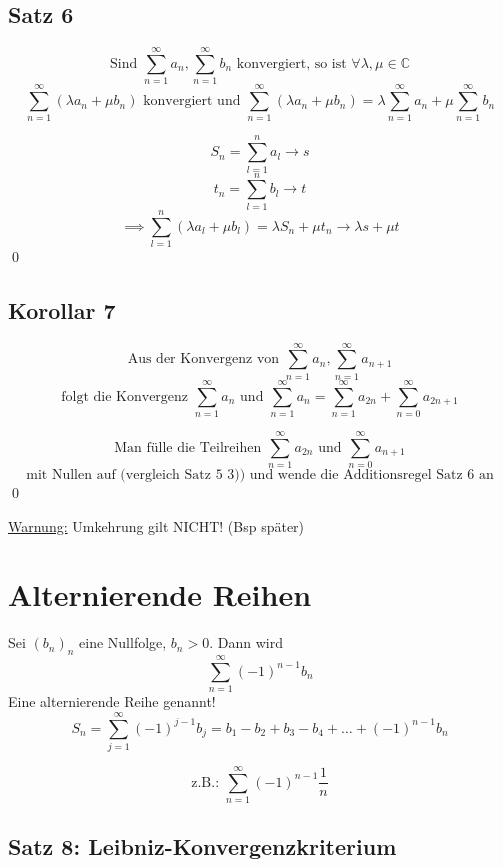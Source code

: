 \documentclass[fleqn]{scrbook}
\renewenvironment{proof}{{\bfseries Beweis }}{\qed}
\begin{document}
\subsection{Satz 6}

\[\text{Sind } \sum_{n=1}^\infty a_n, \sum_{n=1}^\infty b_n \text{  konvergiert, so ist } \forall \lambda, \mu \in \mathbb{C}\]
\[\sum_{n=1}^\infty (\lambda a_n + \mu b_n) \text{ konvergiert  und } \sum_{n=1}^\infty (\lambda a_n + \mu b_n) = \lambda \sum_{n=1}^\infty a_n + \mu \sum_{n=1}^\infty b_n \]

\begin{proof}
  \[S_n = \sum_{l=1}^n a_l \to s\]
  \[t_n = \sum_{l=1}^n b_l \to t\]
  \[\implies \sum_{l=1}^n (\lambda a_l + \mu b_l) = \lambda S_n + \mu t_n \to \lambda s + \mu t\]
\end{proof}

\subsection{Korollar 7}

\[\text{Aus der Konvergenz von } \sum_{n=1}^\infty a_n, \sum_{n=1}^\infty a_{n+1}\]
\[\text{folgt die Konvergenz } \sum_{n=1}^\infty a_n
\text{ und } \sum_{n=1}^\infty a_n = \sum_{n=1}^\infty a_{2n} + \sum_{n=0}^\infty a_{2n+1}\]

\begin{proof}
  \[\text{Man fülle die Teilreihen } \sum_{n=1}^\infty a_{2n} \text{ und } \sum_{n=0}^\infty a_{n+1}\]
  \[\text{mit Nullen auf (vergleich Satz 5 3)) und wende die Additionsregel Satz 6 an}\] 
\end{proof}

\underline{Warnung:} Umkehrung gilt NICHT! (Bsp später)

\section{Alternierende Reihen}

Sei $(b_n)_n$ eine Nullfolge, $b_n > 0$. Dann wird
\[\sum_{n=1}^\infty (-1)^{n-1} b_n\]
Eine alternierende Reihe genannt!
\[S_n = \sum_{j=1}^\infty (-1)^{j-1} b_j = b_1-b_2+b_3-b_4+\ldots+(-1)^{n-1} b_n\]

\[\text{z.B.: } \sum_{n=1}^\infty (-1)^{n-1} \frac{1}{n}\]

\subsection{Satz 8: Leibniz-Konvergenzkriterium}
\end{document}
